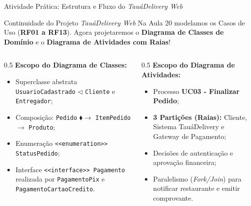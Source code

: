 \documentclass[10pt]{beamer}
\begin{document}
\begin{frame}{Atividade Prática: Estrutura e Fluxo do \textit{TauáDelivery Web}}
    \begin{block}{Continuidade do Projeto \textit{TauáDelivery Web}}
        Na Aula 20 modelamos os Casos de Uso (\textbf{RF01 a RF13}). Agora projetaremos o \textbf{Diagrama de Classes de Domínio} e o \textbf{Diagrama de Atividades com Raias}!
    \end{block}
    \vspace{0.15cm}
    \begin{columns}
        \begin{column}{0.5\textwidth}
            \textbf{Escopo do Diagrama de Classes:}
            \begin{itemize}
                \item Superclasse abstrata \texttt{UsuarioCadastrado} $\triangleleft$ \texttt{Cliente} e \texttt{Entregador};
                \item Composição: \texttt{Pedido} $\blacklozenge\to$ \texttt{ItemPedido} $\to$ \texttt{Produto};
                \item Enumeração \texttt{<<enumeration>> StatusPedido};
                \item Interface \texttt{<<interface>> Pagamento} realizada por \texttt{PagamentoPix} e \texttt{PagamentoCartaoCredito}.
            \end{itemize}
        \end{column}
        \begin{column}{0.5\textwidth}
            \textbf{Escopo do Diagrama de Atividades:}
            \begin{itemize}
                \item Processo \textbf{UC03 - Finalizar Pedido};
                \item \textbf{3 Partições (Raias):} Cliente, Sistema TauáDelivery e Gateway de Pagamento;
                \item Decisões de autenticação e aprovação financeira;
                \item Paralelismo (\textit{Fork/Join}) para notificar restaurante e emitir comprovante.
            \end{itemize}
        \end{column}
    \end{columns}
\end{frame}
\end{document}
